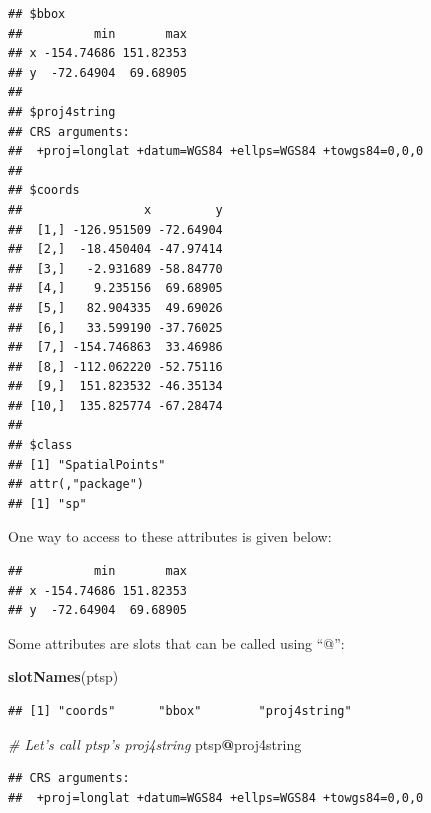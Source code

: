 \documentclass[]{report}
\newenvironment{Shaded}{\begin{snugshade}}{\end{snugshade}}
\newcommand{\CommentTok}[1]{\textcolor[rgb]{0.56,0.35,0.01}{\textit{#1}}}
\newcommand{\KeywordTok}[1]{\textcolor[rgb]{0.13,0.29,0.53}{\textbf{#1}}}
\newcommand{\NormalTok}[1]{#1}
\newcommand{\OperatorTok}[1]{\textcolor[rgb]{0.81,0.36,0.00}{\textbf{#1}}}
\begin{document}
\begin{verbatim}
## $bbox
##          min       max
## x -154.74686 151.82353
## y  -72.64904  69.68905
## 
## $proj4string
## CRS arguments:
##  +proj=longlat +datum=WGS84 +ellps=WGS84 +towgs84=0,0,0 
## 
## $coords
##                 x         y
##  [1,] -126.951509 -72.64904
##  [2,]  -18.450404 -47.97414
##  [3,]   -2.931689 -58.84770
##  [4,]    9.235156  69.68905
##  [5,]   82.904335  49.69026
##  [6,]   33.599190 -37.76025
##  [7,] -154.746863  33.46986
##  [8,] -112.062220 -52.75116
##  [9,]  151.823532 -46.35134
## [10,]  135.825774 -67.28474
## 
## $class
## [1] "SpatialPoints"
## attr(,"package")
## [1] "sp"
\end{verbatim}

One way to access to these attributes is given below:

\begin{Shaded}
\end{Shaded}

\begin{verbatim}
##          min       max
## x -154.74686 151.82353
## y  -72.64904  69.68905
\end{verbatim}

Some attributes are slots that can be called using ``@'':

\begin{Shaded}
\begin{Highlighting}[]
\KeywordTok{slotNames}\NormalTok{(ptsp)}
\end{Highlighting}
\end{Shaded}

\begin{verbatim}
## [1] "coords"      "bbox"        "proj4string"
\end{verbatim}

\begin{Shaded}
\begin{Highlighting}[]
\CommentTok{# Let's call ptsp's proj4string}
\NormalTok{ptsp}\OperatorTok{@}\NormalTok{proj4string}
\end{Highlighting}
\end{Shaded}

\begin{verbatim}
## CRS arguments:
##  +proj=longlat +datum=WGS84 +ellps=WGS84 +towgs84=0,0,0
\end{verbatim}
\end{document}
